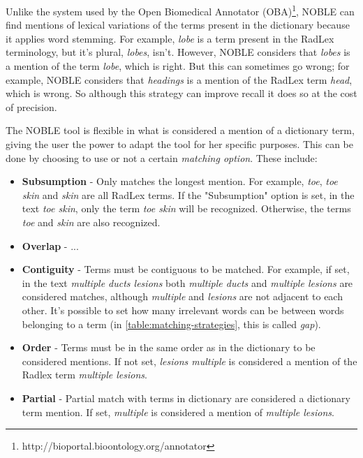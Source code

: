 Unlike the system used by the Open Biomedical Annotator (OBA)\footnote{http://bioportal.bioontology.org/annotator}\citep{Jonquet2009}, NOBLE can find mentions of lexical variations of the terms present in the dictionary because it applies word stemming. For example, \textit{lobe} is a term present in the RadLex terminology, but it's plural, \textit{lobes}, isn't. However, NOBLE considers that \textit{lobes} is a mention of the term \textit{lobe}, which is right. But this can sometimes go wrong; for example, NOBLE considers that \textit{headings} is a mention of the RadLex term \textit{head}, which is wrong. So although this strategy can improve recall it does so at the cost of precision. 

The NOBLE tool is flexible in what is considered a mention of a dictionary term, giving the user the power to adapt the tool for her specific purposes. This can be done by choosing to use or not a certain \textit{matching option}. These include:

\begin{itemize}

\item \textbf{Subsumption} - Only matches the longest mention. For example, \textit{toe}, \textit{toe skin} and \textit{skin} are all RadLex terms. If the "Subsumption" option is set, in the text \textit{toe skin}, only the term \textit{toe skin} will be recognized. Otherwise, the terms \textit{toe} and \textit{skin} are also recognized.

\item \textbf{Overlap} - ...

\item \textbf{Contiguity} - Terms must be contiguous to be matched. For example, if set, in the text \textit{multiple ducts lesions} both \textit{multiple ducts} and \textit{multiple lesions} are considered matches, although \textit{multiple} and \textit{lesions} are not adjacent to each other. It's possible to set how many irrelevant words can be between words belonging to a term (in \ref{table:matching-strategies}, this is called \textit{gap}). 

\item \textbf{Order} - Terms must be in the same order as in the dictionary to be considered mentions. If not set, \textit{lesions multiple} is considered a mention of the Radlex term \textit{multiple lesions}.

\item \textbf{Partial} - Partial match with terms in dictionary are considered a dictionary term mention. If set, \textit{multiple} is considered a mention of \textit{multiple lesions}. 

\end{itemize}

